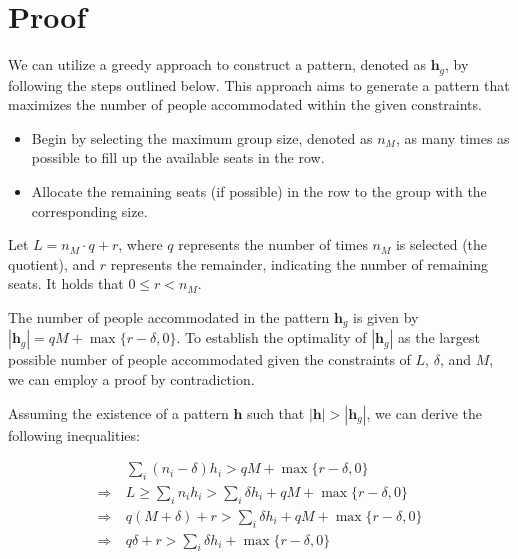 \clearpage
\section*{Proof}

\begin{pf}
We can utilize a greedy approach to construct a pattern, denoted as $\bm{h}_{g}$, by following the steps outlined below. This approach aims to generate a pattern that maximizes the number of people accommodated within the given constraints.

\begin{itemize}
 \item Begin by selecting the maximum group size, denoted as $n_M$, as many times as possible to fill up the available seats in the row.
 \item Allocate the remaining seats (if possible) in the row to the group with the corresponding size.
\end{itemize}

Let $L = n_M \cdot q + r$, where $q$ represents the number of times $n_M$ is selected (the quotient), and $r$ represents the remainder, indicating the number of remaining seats. It holds that $0 \leq r < n_M$. 

The number of people accommodated in the pattern $\bm{h}_{g}$ is given by $|\bm{h}_{g}| = q M + \max\{r-\delta, 0\}$. To establish the optimality of $|\bm{h}_{g}|$ as the largest possible number of people accommodated given the constraints of $L$, $\delta$, and $M$, we can employ a proof by contradiction.



Assuming the existence of a pattern $\bm{h}$ such that $|\bm{h}| > |\bm{h}_{g}|$, we can derive the following inequalities: 

\begin{align*}
  & \sum_{i} (n_i - \delta) h_i > q M + \max\{r-\delta, 0\} \\
  \Rightarrow ~& L \geq \sum_{i} n_i h_i > \sum_{i} \delta h_i + q M + \max\{r-\delta, 0\} \\
  \Rightarrow ~& q(M + \delta) + r > \sum_{i} \delta h_i + q M + \max\{r-\delta, 0\} \\
  \Rightarrow ~& q \delta + r > \sum_{i} \delta h_i + \max\{r-\delta, 0\}
\end{align*}


\end{pf}

